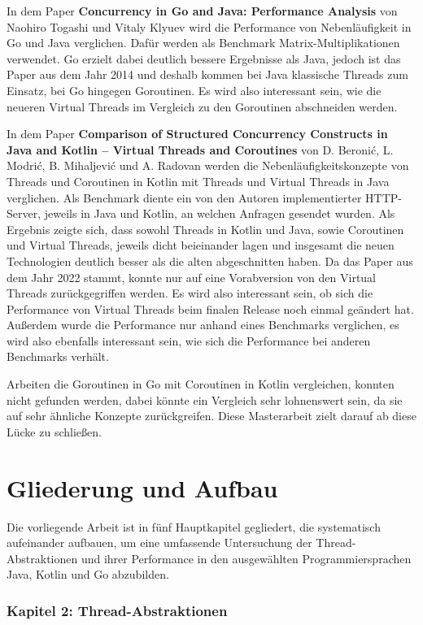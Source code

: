 \documentclass[fontsize=12pt,paper=a4,twoside=semi,parskip=half-,headsepline,headinclude]{scrreprt}
\begin{document}
In dem Paper \textbf{Concurrency in Go and Java: Performance Analysis} \cite{Togashi2014} von Naohiro Togashi und Vitaly Klyuev wird die Performance von Nebenläufigkeit in Go und Java verglichen. Dafür werden als Benchmark Matrix-Multiplikationen verwendet. Go erzielt dabei deutlich bessere Ergebnisse als Java, jedoch ist das Paper aus dem Jahr 2014 und deshalb kommen bei Java klassische Threads zum Einsatz, bei Go hingegen Goroutinen. Es wird also interessant sein, wie die neueren Virtual Threads im Vergleich zu den Goroutinen abschneiden werden.

In dem Paper \textbf{Comparison of Structured Concurrency Constructs in Java and Kotlin – Virtual Threads and Coroutines} \cite{Modric2022} von D. Beronić, L. Modrić, B. Mihaljević und A. Radovan werden die Nebenläufigkeitskonzepte von Threads und Coroutinen in Kotlin mit Threads und Virtual Threads in Java verglichen. Als Benchmark diente ein von den Autoren implementierter HTTP-Server, jeweils in Java und Kotlin, an welchen Anfragen gesendet wurden. Als Ergebnis zeigte sich, dass sowohl Threads in Kotlin und Java, sowie Coroutinen und Virtual Threads, jeweils dicht beieinander lagen und insgesamt die neuen Technologien deutlich besser als die alten abgeschnitten haben. Da das Paper aus dem Jahr 2022 stammt, konnte nur auf eine Vorabversion von den Virtual Threads zurückgegriffen werden. Es wird also interessant sein, ob sich die Performance von Virtual Threads beim finalen Release noch einmal geändert hat. Außerdem wurde die Performance nur anhand eines Benchmarks verglichen, es wird also ebenfalls interessant sein, wie sich die Performance bei anderen Benchmarks verhält.

Arbeiten die Goroutinen in Go mit Coroutinen in Kotlin vergleichen, konnten nicht gefunden werden, dabei könnte ein Vergleich sehr lohnenswert sein, da sie auf sehr ähnliche Konzepte zurückgreifen. Diese Masterarbeit zielt darauf ab diese Lücke zu schließen.

\section{Gliederung und Aufbau}

Die vorliegende Arbeit ist in fünf Hauptkapitel gegliedert, die systematisch aufeinander aufbauen, um eine umfassende Untersuchung der Thread-Abstraktionen und ihrer Performance in den ausgewählten Programmiersprachen Java, Kotlin und Go abzubilden.

\subsubsection{Kapitel 2: Thread-Abstraktionen}
\end{document}
